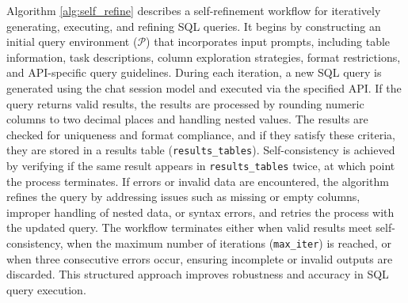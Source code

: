 Algorithm \ref{alg:self_refine} describes a self-refinement workflow for iteratively generating, executing, and refining SQL queries. It begins by constructing an initial query environment ($\mathcal{P}$) that incorporates input prompts, including table information, task descriptions, column exploration strategies, format restrictions, and API-specific query guidelines. During each iteration, a new SQL query is generated using the chat session model and executed via the specified API. If the query returns valid results, the results are processed by rounding numeric columns to two decimal places and handling nested values. The results are checked for uniqueness and format compliance, and if they satisfy these criteria, they are stored in a results table (\texttt{results\_tables}). Self-consistency is achieved by verifying if the same result appears in \texttt{results\_tables} twice, at which point the process terminates. If errors or invalid data are encountered, the algorithm refines the query by addressing issues such as missing or empty columns, improper handling of nested data, or syntax errors, and retries the process with the updated query. The workflow terminates either when valid results meet self-consistency, when the maximum number of iterations (\texttt{max\_iter}) is reached, or when three consecutive errors occur, ensuring incomplete or invalid outputs are discarded. This structured approach improves robustness and accuracy in SQL query execution.
